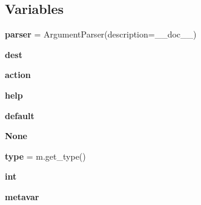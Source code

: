 \subsection*{Variables}
\begin{DoxyCompactItemize}
\item 
\mbox{\label{namespacepymavlink_1_1tools_1_1mavlogdump_a5944af650a62ea2df82b07337e46c14a}} 
{\bfseries parser} = Argument\+Parser(description=\+\_\+\+\_\+doc\+\_\+\+\_\+)
\item 
\mbox{\label{namespacepymavlink_1_1tools_1_1mavlogdump_a9da9d09d43b823d7f0dbda7c0cd53b06}} 
{\bfseries dest}
\item 
\mbox{\label{namespacepymavlink_1_1tools_1_1mavlogdump_a0d6aaf7db0ab044f6fccc41aef82b384}} 
{\bfseries action}
\item 
\mbox{\label{namespacepymavlink_1_1tools_1_1mavlogdump_a4059ef7894b5364373bb603635bda68c}} 
{\bfseries help}
\item 
\mbox{\label{namespacepymavlink_1_1tools_1_1mavlogdump_a6759c30206138cc486b4e4518b422f83}} 
{\bfseries default}
\item 
\mbox{\label{namespacepymavlink_1_1tools_1_1mavlogdump_a4f907ac5c5d06d13d8020f0969229a7e}} 
{\bfseries None}
\item 
\mbox{\label{namespacepymavlink_1_1tools_1_1mavlogdump_addcfd2a4909e9a13151d343dd1988994}} 
{\bfseries type} = m.\+get\+\_\+type()
\item 
\mbox{\label{namespacepymavlink_1_1tools_1_1mavlogdump_a2fe404e5ba17834d53138cfe0a4fd638}} 
{\bfseries int}
\item 
\mbox{\label{namespacepymavlink_1_1tools_1_1mavlogdump_ad27718929cd610a9c09431db2ee5a519}} 
{\bfseries metavar}
\item 
\mbox{\label{namespacepymavlink_1_1tools_1_1mavlogdump_a82cc95658402c05811fc36d24293de5f}} 

\end{DoxyCompactItemize}
